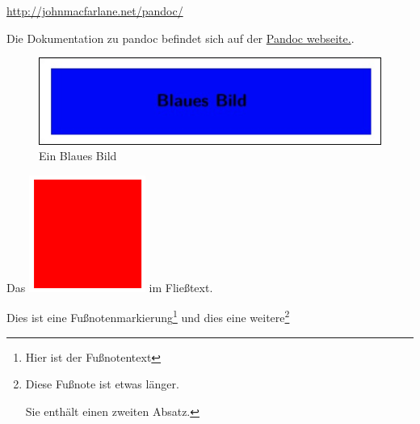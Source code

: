\documentclass{article}
\makeatletter
\def\maxwidth{\ifdim\Gin@nat@width>\linewidth\linewidth
\else\Gin@nat@width\fi}
\let\Oldincludegraphics\includegraphics
\renewcommand{\includegraphics}[1]{\Oldincludegraphics[width=\maxwidth]{#1}}
\makeatother
\begin{document}
\url{http://johnmacfarlane.net/pandoc/}

Die Dokumentation zu pandoc befindet sich auf der
\href{http://johnmacfarlane.net/pandoc/}{Pandoc webseite.}.

\begin{figure}[htbp]
\centering
\includegraphics{blau.jpg}
\caption{Ein Blaues Bild}
\end{figure}

Das \includegraphics{rot.png} im Fließtext.

Dies ist eine Fußnotenmarkierung\footnote{Hier ist der Fußnotentext} und
dies eine weitere\footnote{Diese Fußnote ist etwas länger.

  Sie enthält einen zweiten Absatz.}
\end{document}
